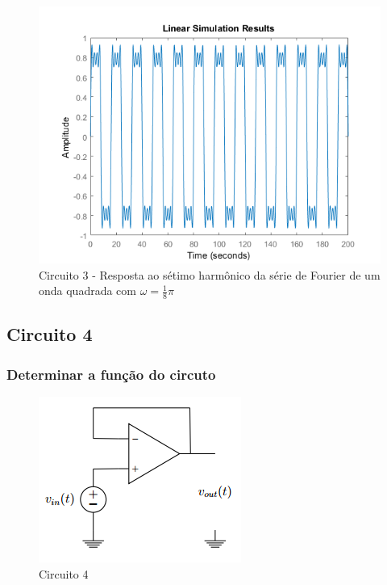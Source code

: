 \documentclass[a4paper, 12pt]{article}
\begin{document}
			\begin{figure}[!ht]
				\centering
				\includegraphics[scale=0.71]{img/1m_circ3.png}
				\caption{Circuito 3 - Resposta ao sétimo harmônico da série de Fourier de um onda quadrada com $\omega = \frac{1}{8}\pi$}	
			\end{figure}				
		\subsection{Circuito 4}
			\subsubsection{Determinar a função do circuto}
			\begin{figure}[!ht]
				\centering
				\includegraphics{img/circuito4.png}
				\caption{Circuito 4}	
			\end{figure}		
			
\end{document}
